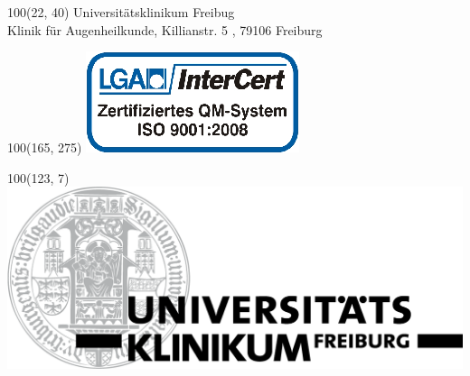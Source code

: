\documentclass[12pt]{g-brief}
\begin{document}
\baselineskip10pt

\textblockorigin{0in}{0in}
\setlength{\TPHorizModule}{1mm}
\setlength{\TPVertModule}{1mm}

{

\begin{textblock}{100}(22, 40) 
\noindent 
\scriptsize
Universitätsklinikum Freibug\\
\scriptsize
Klinik für Augenheilkunde, Killianstr. 5 , 79106 Freiburg
\end{textblock}
}

{
\begin{textblock}{100}(165, 275) 
\includegraphics[scale=0.4]{LogoFrei.png}
\end{textblock}
}

{
\begin{textblock}{100}(123, 7) 
\includegraphics[scale=0.25]{Formuladr.png}
\end{textblock}
}
\end{document}

